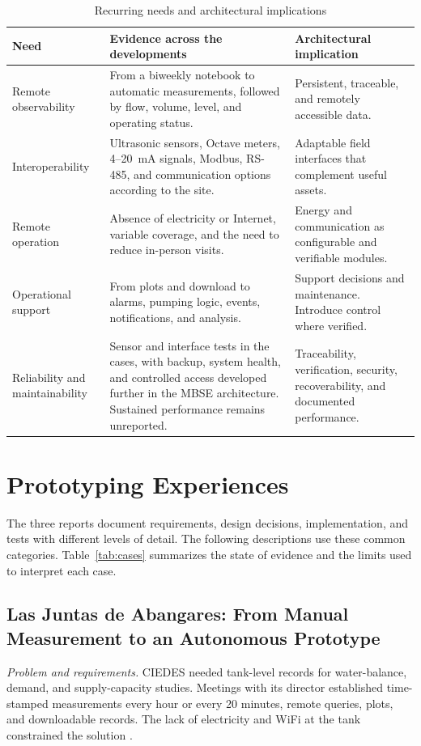 \documentclass[conference]{IEEEtran}
\begin{document}
\begin{table}[t]
\caption{Recurring needs and architectural implications}
\label{tab:needs}
\centering
\scriptsize
\renewcommand{\arraystretch}{1.05}
\begin{tabularx}{\textwidth}{|>{\raggedright\arraybackslash}p{}|>{\raggedright\arraybackslash}X|>{\raggedright\arraybackslash}X|}
\hline
\textbf{Need} & \textbf{Evidence across the developments} & \textbf{Architectural implication} \\
\hline
Remote observability & From a biweekly notebook to automatic measurements, followed by flow, volume, level, and operating status. & Persistent, traceable, and remotely accessible data. \\
\hline
Interoperability & Ultrasonic sensors, Octave meters, 4--20~mA signals, Modbus, RS-485, and communication options according to the site. & Adaptable field interfaces that complement useful assets. \\
\hline
Remote operation & Absence of electricity or Internet, variable coverage, and the need to reduce in-person visits. & Energy and communication as configurable and verifiable modules. \\
\hline
Operational support & From plots and download to alarms, pumping logic, events, notifications, and analysis. & Support decisions and maintenance. Introduce control where verified. \\
\hline
Reliability and maintainability & Sensor and interface tests in the cases, with backup, system health, and controlled access developed further in the MBSE architecture. Sustained performance remains unreported. & Traceability, verification, security, recoverability, and documented performance. \\
\hline
\end{tabularx}
\end{table}

\section{Prototyping Experiences}
The three reports document requirements, design decisions, implementation, and tests with different levels of detail. The following descriptions use these common categories. Table~\ref{tab:cases} summarizes the state of evidence and the limits used to interpret each case.

\subsection{Las Juntas de Abangares: From Manual Measurement to an Autonomous Prototype}
\textit{Problem and requirements.} CIEDES needed tank-level records for water-balance, demand, and supply-capacity studies. Meetings with its director established time-stamped measurements every hour or every 20 minutes, remote queries, plots, and downloadable records. The lack of electricity and WiFi at the tank constrained the solution \cite[Secs.~4.1--4.3]{chavarria2021implementacion}.
\end{document}
